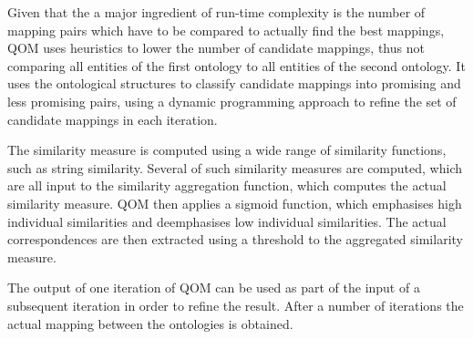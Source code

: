 Given that the a major ingredient of run-time complexity is the number
of mapping pairs which have to be compared to actually find the best
mappings, QOM uses heuristics to lower the number of candidate
mappings, thus not comparing all entities of the first ontology to all
entities of the second ontology. It uses the ontological structures to
classify candidate mappings into promising and less promising pairs,
using a dynamic programming approach to refine the set of candidate
mappings in each iteration. 

The similarity measure is computed using a wide range of similarity
functions, such as string similarity. Several of such similarity
measures are computed, which are all input to the similarity
aggregation function, which computes the actual similarity measure. QOM
then applies a sigmoid function, which emphasises high individual
similarities and deemphasises low individual similarities. The actual
correspondences are then extracted using a threshold to the aggregated
similarity measure. 

The output of one iteration of QOM can be used as part of the input of a
subsequent iteration in order to refine the result. After a number of
iterations the actual mapping between the ontologies is obtained. 
